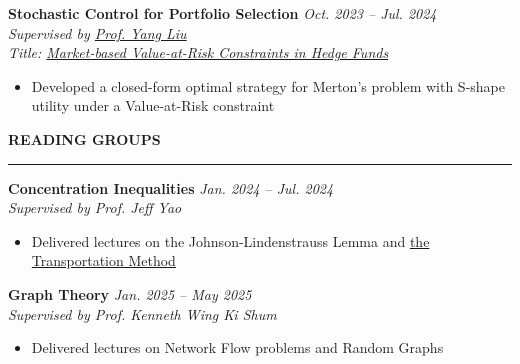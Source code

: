 \documentclass[10pt]{extarticle}
\newlength{\titlelength}
\newcommand{\customsection}[1]{
  \vspace{0.4em}%
  \settowidth{\titlelength}{\color{sectioncolor}\Large\bfseries\uppercase{#1}}
  {\color{sectioncolor}\Large\bfseries\uppercase{#1}} 
  {\color{sectioncolor}\rule[0.5ex]{\linewidth-\titlelength-0em}{0.5pt}}\par\vspace{0.2em}%
}
\begin{document}
\textbf{Stochastic Control for Portfolio Selection} \hfill \textit{Oct. 2023 -- Jul. 2024}\\
\textit{Supervised by \href{https://yang-liu16.github.io/}{Prof. Yang Liu}}\\
\textit{Title: \href{https://bingran-li.github.io/blog/Merton's\%20Problem.html\#stochastic-control-for-portfolio-selection-merton-s-problem}{Market-based Value-at-Risk Constraints in Hedge Funds}}
\begin{itemize}[leftmargin=1em, label=$\bullet$, nosep, topsep=0pt]
  \item Developed a closed-form optimal strategy for Merton's problem with S-shape utility under a Value-at-Risk constraint
\end{itemize}


\customsection{Reading Groups} 
\textbf{Concentration Inequalities} \hfill \textit{Jan. 2024 -- Jul. 2024}\\
\textit{Supervised by Prof. Jeff Yao}
\begin{itemize}[leftmargin=1em, label=$\bullet$, nosep, topsep=0pt]
  \item Delivered lectures on the Johnson-Lindenstrauss Lemma and \href{https://bingran-li.github.io/blog/Concentration\%20Inequalities-Reading\%20Group.html\#concentration-inequalities-reading-group}{the Transportation Method}
\end{itemize}

\textbf{Graph Theory} \hfill \textit{Jan. 2025 -- May 2025}\\
\textit{Supervised by Prof. Kenneth Wing Ki Shum}
\begin{itemize}[leftmargin=1em, label=$\bullet$, nosep, topsep=0pt]
  \item Delivered lectures on Network Flow problems and Random Graphs
\end{itemize}
\end{document}
